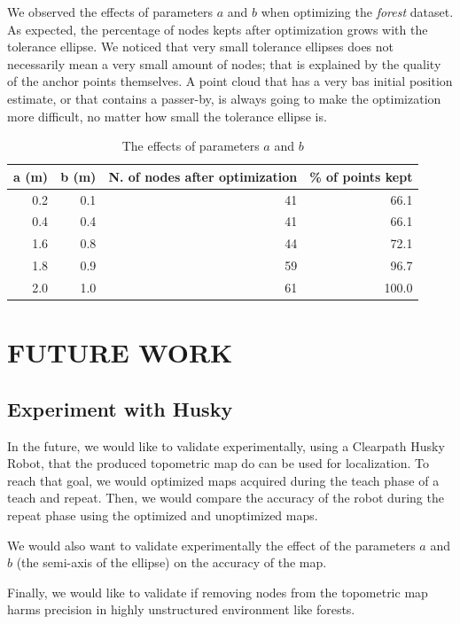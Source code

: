 \documentclass[letterpaper,10 pt,conference]{ieeeconf}
\begin{document}
We observed the effects of parameters $a$ and $b$ when optimizing the \textit{forest} dataset. As
expected, the percentage of nodes kepts after optimization grows with the tolerance ellipse. We
noticed that very small tolerance ellipses does not necessarily mean a very small amount of nodes;
that is explained by the quality of the anchor points themselves. A point cloud that has a very bas
initial position estimate, or that contains a passer-by, is always going to make the optimization
more difficult, no matter how small the tolerance ellipse is.

\begin{table}[h]
\centering
\begin{tabular}{|r|r|r|r|}
  \hline
a (m) & b (m) &  N. of nodes after optimization & \% of points kept \\
\hline
  0.2 & 0.1 & 41 & 66.1  \\
\hline
 0.4 & 0.4 & 41 & 66.1 \\
  \hline
 1.6 & 0.8 & 44 & 72.1 \\
  \hline
1.8 & 0.9 & 59 & 96.7 \\
  \hline
  2.0 & 1.0 & 61 & 100.0 \\
  \hline
\end{tabular}
\caption{The effects of parameters $a$ and $b$}
\label{tabopti}
\end{table}

\section{FUTURE WORK}

\subsection{Experiment with Husky}
In the future, we would like to validate experimentally, using a Clearpath Husky Robot, that the produced topometric map do can be used for localization.
To reach that goal, we would optimized maps acquired during the teach phase of a teach and repeat. Then, we would compare
the accuracy of the robot during the repeat phase using the optimized and unoptimized maps.

We would also want to validate experimentally the effect of the parameters $a$ and $b$ (the semi-axis of the ellipse)
on the accuracy of the map.

Finally, we would like to validate if removing nodes from the topometric map harms precision in highly unstructured environment like forests.
\end{document}
